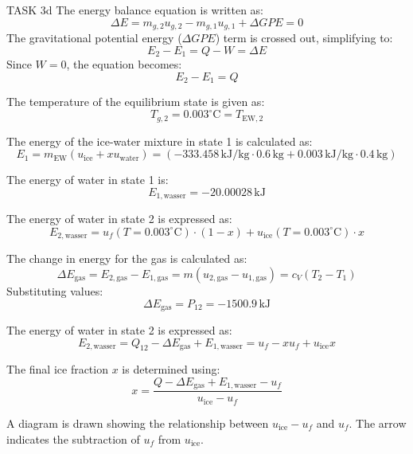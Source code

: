 TASK 3d  
The energy balance equation is written as:  
\[
\Delta E = m_{g,2} u_{g,2} - m_{g,1} u_{g,1} + \Delta GPE = 0
\]  
The gravitational potential energy (\( \Delta GPE \)) term is crossed out, simplifying to:  
\[
E_2 - E_1 = Q - W = \Delta E
\]  
Since \( W = 0 \), the equation becomes:  
\[
E_2 - E_1 = Q
\]  

The temperature of the equilibrium state is given as:  
\[
T_{g,2} = 0.003^\circ \text{C} = T_{\text{EW},2}
\]  

The energy of the ice-water mixture in state 1 is calculated as:  
\[
E_1 = m_{\text{EW}} (u_{\text{ice}} + x u_{\text{water}}) = (-333.458 \, \text{kJ/kg} \cdot 0.6 \, \text{kg} + 0.003 \, \text{kJ/kg} \cdot 0.4 \, \text{kg})
\]  

The energy of water in state 1 is:  
\[
E_{1,\text{wasser}} = -20.00028 \, \text{kJ}
\]  

The energy of water in state 2 is expressed as:  
\[
E_{2,\text{wasser}} = u_f(T = 0.003^\circ \text{C}) \cdot (1 - x) + u_{\text{ice}}(T = 0.003^\circ \text{C}) \cdot x
\]  

The change in energy for the gas is calculated as:  
\[
\Delta E_{\text{gas}} = E_{2,\text{gas}} - E_{1,\text{gas}} = m (u_{2,\text{gas}} - u_{1,\text{gas}}) = c_V (T_2 - T_1)
\]  
Substituting values:  
\[
\Delta E_{\text{gas}} = P_{12} = -1500.9 \, \text{kJ}
\]  

The energy of water in state 2 is expressed as:  
\[
E_{2,\text{wasser}} = Q_{12} - \Delta E_{\text{gas}} + E_{1,\text{wasser}} = u_f - x u_f + u_{\text{ice}} x
\]  

The final ice fraction \( x \) is determined using:  
\[
x = \frac{Q - \Delta E_{\text{gas}} + E_{1,\text{wasser}} - u_f}{u_{\text{ice}} - u_f}
\]  

A diagram is drawn showing the relationship between \( u_{\text{ice}} - u_f \) and \( u_f \). The arrow indicates the subtraction of \( u_f \) from \( u_{\text{ice}} \).